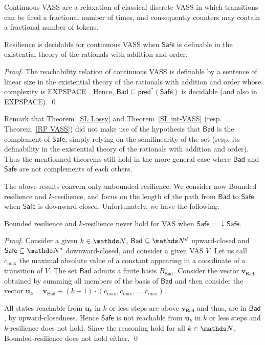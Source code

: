 \documentclass[runningheads]{llncs}
\newcommand{\pred}{\textsf{pred}}
\newcommand{\Bad}{\textsf{Bad}}
\newcommand{\Safe}{\textsf{Safe}}
\begin{document}
Continuous VASS \cite{DBLP:journals/tocl/BlondinFHH17} are a relaxation of classical discrete VASS in which transitions can be fired a fractional number of times, and consequently counters may contain a fractional number of tokens.

\begin{theorem}\label{RP VASS}
{\sc Resilience} is decidable for continuous VASS when $\Safe$  is
definable in the existential theory of the rationals with addition and order.
\end{theorem}

\begin{proof}
The reachability relation of continuous VASS is definable by a sentence of linear size in the existential theory of
the rationals with addition and order whose complexity is EXPSPACE \cite{DBLP:journals/tocl/BlondinFHH17}. Hence, $\Bad \subseteq \pred^*(\Safe)$ is decidable (and also in EXPSPACE). \qed
\end{proof}


Remark that
Theorem~\ref{SL Lossy} and
Theorem~\ref{SL int-VASS}
(resp. Theorem~\ref{RP VASS})
did not make use of the hypothesis that $\Bad$ is the complement of $\Safe$, simply relying on the
semilinearity of the set (resp. its definability in the existential theory of the rationals with addition and order). Thus 
the mentionned theorems still hold in the more general case where $\Bad$ and $\Safe$ are not complements of each others.

The above results concern only unbounded resilience. We consider now 
{\sc Bounded resilience} and {\sc $k$-resilience}, and focus on the length of
the path from $\Bad$ to $\Safe$
when $\Safe$ is downward-closed. Unfortunately, we have the following:
\begin{proposition}
{\sc Bounded resilience} and {\sc $k$-resilience} never hold for VAS when $\Safe = \downarrow \Safe$.
\end{proposition}


\begin{proof}
Consider a given $k \in \N$,
 $\Bad \subseteq \N^d$ upward-closed and $\Safe \subseteq \N^d$ downward-closed, and
consider a given VAS $V$.
Let us call $c_{\max}$ the maximal absolute value of a constant appearing in a coordinate of a transition of $V$.
The set $\Bad$ admits a finite basis $B_\Bad$.
Consider the vector $\textbf{v}_{\Bad}$ obtained by summing all members of the basis of $\Bad$ and then consider the vector
$\textbf{u}_k = \textbf{v}_{\Bad} + (k+1) \cdot (c_{\max}, c_{\max}, \ldots, c_{\max})$.

All states reachable from $\textbf{u}_k$ in $k$ or less steps are above $ \textbf{v}_{\Bad} $
and thus, are in $\Bad$, by upward-closedness.
Hence  $\Safe$ is not reachable from $\textbf{u}_k$ in $k$ or less steps  and {$k$-resilience} does not hold.
Since the reasoning hold for all $k \in \N$, {\sc Bounded-resilience} does not hold either.
\qed
\end{proof}
\end{document}
